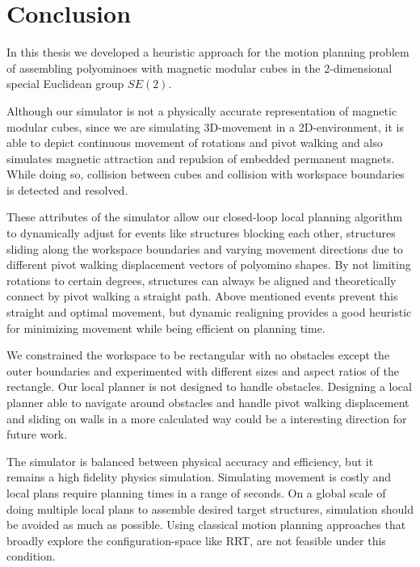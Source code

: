 \chapter{Conclusion}
\label{chap:conclusion}

In this thesis we developed a heuristic approach for the motion planning problem of assembling polyominoes with magnetic modular cubes \cite{Bhattacharjee2022} in the 2-dimensional special Euclidean group $\textit{SE}(2)$.

Although our simulator is not a physically accurate representation of magnetic modular cubes, since we are simulating 3D-movement in a 2D-environment, it is able to depict continuous movement of rotations and pivot walking and also simulates magnetic attraction and repulsion of embedded permanent magnets.
While doing so, collision between cubes and collision with workspace boundaries is detected and resolved.

These attributes of the simulator allow our closed-loop local planning algorithm to dynamically adjust for events like structures blocking each other, structures sliding along the workspace boundaries and varying movement directions due to different pivot walking displacement vectors of polyomino shapes.
By not limiting rotations to certain degrees, structures can always be aligned and theoretically connect by pivot walking a straight path.
Above mentioned events prevent this straight and optimal movement, but dynamic realigning provides a good heuristic for minimizing movement while being efficient on planning time.

We constrained the workspace to be rectangular with no obstacles except the outer boundaries and experimented with different sizes and aspect ratios of the rectangle.
Our local planner is not designed to handle obstacles.
Designing a local planner able to navigate around obstacles and handle pivot walking displacement and sliding on walls in a more calculated way could be a interesting direction for future work.

The simulator is balanced between physical accuracy and efficiency, but it remains a high fidelity physics simulation.
Simulating movement is costly and local plans require planning times in a range of seconds.
On a global scale of doing multiple local plans to assemble desired target structures, simulation should be avoided as much as possible.
Using classical motion planning approaches that broadly explore the configuration-space like RRT, are not feasible under this condition.

